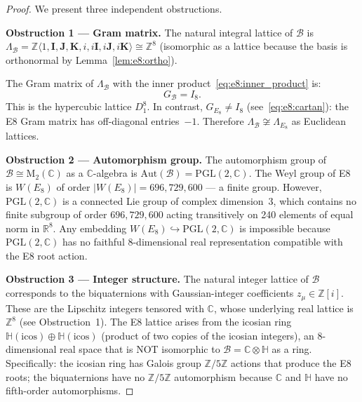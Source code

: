 \documentclass[12pt,a4paper]{article}
\theoremstyle{definition}
\theoremstyle{remark}
\begin{document}
\begin{proof}
We present three independent obstructions.

\medskip
\textbf{Obstruction 1 — Gram matrix.}
The natural integral lattice of $\mathcal{B}$ is
$\Lambda_{\mathcal{B}} = \mathbb{Z}\langle 1, \mathbf{I}, \mathbf{J}, \mathbf{K},
i, i\mathbf{I}, i\mathbf{J}, i\mathbf{K}\rangle \cong \mathbb{Z}^8$
(isomorphic as a lattice because the basis is orthonormal by Lemma~\ref{lem:e8:ortho}).

The Gram matrix of $\Lambda_{\mathcal{B}}$ with the inner product~\eqref{eq:e8:inner_product} is:
\begin{equation}
  G_{\mathcal{B}} = I_8.
  \label{eq:e8:gram_B}
\end{equation}
This is the hypercubic lattice $D_1^8$.  In contrast, $G_{E_8} \neq I_8$
(see~\eqref{eq:e8:cartan}): the E8 Gram matrix has off-diagonal entries~$-1$.
Therefore $\Lambda_{\mathcal{B}} \not\cong \Lambda_{E_8}$ as Euclidean lattices.

\medskip
\textbf{Obstruction 2 — Automorphism group.}
The automorphism group of $\mathcal{B}\cong\mathrm{M}_2(\mathbb{C})$ as a
$\mathbb{C}$-algebra is $\mathrm{Aut}(\mathcal{B}) = \mathrm{PGL}(2,\mathbb{C})$.
The Weyl group of E8 is $W(E_8)$ of order $|W(E_8)| = 696{,}729{,}600$ — a finite
group.  However, $\mathrm{PGL}(2,\mathbb{C})$ is a connected Lie group of complex
dimension~3, which contains no finite subgroup of order $696{,}729{,}600$ acting
transitively on 240 elements of equal norm in $\mathbb{R}^8$.
Any embedding $W(E_8)\hookrightarrow\mathrm{PGL}(2,\mathbb{C})$ is impossible
because $\mathrm{PGL}(2,\mathbb{C})$ has no faithful 8-dimensional real
representation compatible with the E8 root action.

\medskip
\textbf{Obstruction 3 — Integer structure.}
The natural integer lattice of $\mathcal{B}$ corresponds to the biquaternions with
Gaussian-integer coefficients $z_\mu \in \mathbb{Z}[i]$.  These are the Lipschitz
integers tensored with $\mathbb{C}$, whose underlying real lattice is $\mathbb{Z}^8$
(see Obstruction~1).  The E8 lattice arises from the icosian ring
$\mathbb{H}(\mathrm{icos}) \oplus \mathbb{H}(\mathrm{icos})$ (product of two copies
of the icosian integers), an 8-dimensional real space that is NOT isomorphic to
$\mathcal{B} = \mathbb{C}\otimes\mathbb{H}$ as a ring.
Specifically: the icosian ring has Galois group $\mathbb{Z}/5\mathbb{Z}$ actions
that produce the E8 roots; the biquaternions have no $\mathbb{Z}/5\mathbb{Z}$
automorphism because $\mathbb{C}$ and $\mathbb{H}$ have no fifth-order automorphisms.
\end{proof}
\end{document}
